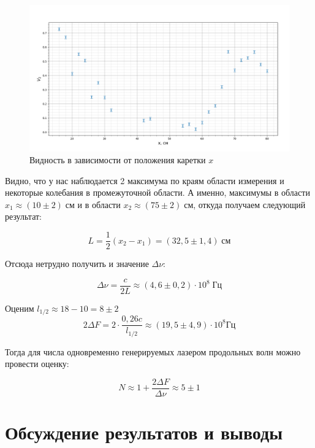 \documentclass[a4paper,12pt]{article}
\begin{document}
\begin{figure}[H]
	\centering
	\includegraphics[width=0.8\linewidth]{Figure_1}
	\caption{Видность в зависимости от положения каретки  $x$}
	\label{fig:figure1}
\end{figure}

Видно, что у нас наблюдается 2 максимума по краям области измерения и некоторые колебания в промежуточной области. А именно, максимумы в области $ x_1 \approx (10 \pm 2) \; см $ и в области $ x_2 \approx (75 \pm 2) \; см $, откуда получаем следующий результат:

\begin{equation}\label{}
	L = \dfrac{1}{2} (x_2 - x_1) = (32,5 \pm 1,4) \; см
\end{equation}

Отсюда нетрудно получить и значение $ \Delta \nu $:

\begin{equation}\label{}
	\Delta \nu = \frac{c}{2L} \approx (4,6 \pm 0,2) \cdot 10^8 \; Гц
\end{equation}

Оценим $ l_{1/2} \approx 18 - 10 = 8 \pm 2 $
\begin{equation}\label{}
	2 \Delta F = 2 \cdot \frac{0,26 c}{l_{1/2}} \approx (19,5 \pm 4,9) \cdot  10^8 Гц
\end{equation}

Тогда для числа одновременно генерируемых лазером продольных волн можно провести оценку:

\begin{equation}\label{}
	N \approx 1 + \dfrac{ 2\Delta F}{\Delta \nu} \approx 5 \pm 1
\end{equation}




\section{Обсуждение результатов и выводы}
\end{document}
